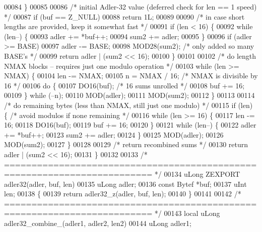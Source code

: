 \begin{DoxyCode}
{{{{00084     \}
00085 
00086     \textcolor{comment}{/* initial Adler-32 value (deferred check for len == 1 speed) */}
00087     \textcolor{keywordflow}{if} (buf == Z\_NULL)
00088         \textcolor{keywordflow}{return} 1L;
00089 
00090     \textcolor{comment}{/* in case short lengths are provided, keep it somewhat fast */}
00091     \textcolor{keywordflow}{if} (len < 16) \{
00092         \textcolor{keywordflow}{while} (len--) \{
00093             adler += *buf++;
00094             sum2 += adler;
00095         \}
00096         \textcolor{keywordflow}{if} (adler >= BASE)
00097             adler -= BASE;
00098         MOD28(sum2);            \textcolor{comment}{/* only added so many BASE's */}
00099         \textcolor{keywordflow}{return} adler | (sum2 << 16);
00100     \}
00101 
00102     \textcolor{comment}{/* do length NMAX blocks -- requires just one modulo operation */}
00103     \textcolor{keywordflow}{while} (len >= NMAX) \{
00104         len -= NMAX;
00105         n = NMAX / 16;          \textcolor{comment}{/* NMAX is divisible by 16 */}
00106         \textcolor{keywordflow}{do} \{
00107             DO16(buf);          \textcolor{comment}{/* 16 sums unrolled */}
00108             buf += 16;
00109         \} \textcolor{keywordflow}{while} (--n);
00110         MOD(adler);
00111         MOD(sum2);
00112     \}
00113 
00114     \textcolor{comment}{/* do remaining bytes (less than NMAX, still just one modulo) */}
00115     \textcolor{keywordflow}{if} (len) \{                  \textcolor{comment}{/* avoid modulos if none remaining */}
00116         \textcolor{keywordflow}{while} (len >= 16) \{
00117             len -= 16;
00118             DO16(buf);
00119             buf += 16;
00120         \}
00121         \textcolor{keywordflow}{while} (len--) \{
00122             adler += *buf++;
00123             sum2 += adler;
00124         \}
00125         MOD(adler);
00126         MOD(sum2);
00127     \}
00128 
00129     \textcolor{comment}{/* return recombined sums */}
00130     \textcolor{keywordflow}{return} adler | (sum2 << 16);
00131 \}
00132 
00133 \textcolor{comment}{/* ========================================================================= */}
00134 uLong ZEXPORT adler32(adler, buf, len)
00135     uLong adler;
00136     \textcolor{keyword}{const} Bytef *buf;
00137     uInt len;
00138 \{
00139     \textcolor{keywordflow}{return} adler32\_z(adler, buf, len);
00140 \}
00141 
00142 \textcolor{comment}{/* ========================================================================= */}
00143 local uLong adler32\_combine\_(adler1, adler2, len2)
00144     uLong adler1;
}}}}
\end{DoxyCode}
